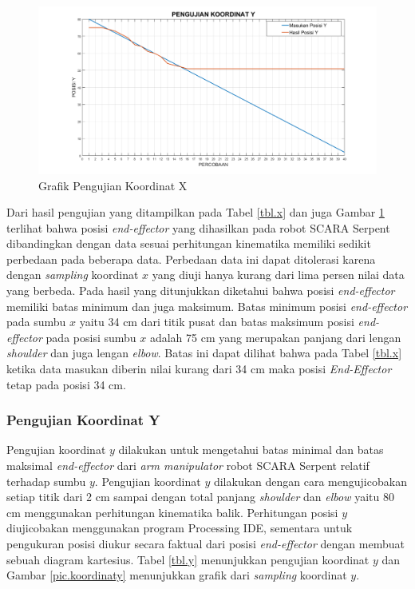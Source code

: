 \fontsize{12}{15}\selectfont
\begin{figure}[H]
	\centering
	\includegraphics[width=12cm]{gambar/px.png}
	\caption{Grafik Pengujian Koordinat X}
	\label{pic.koordinatx}
\end{figure}

Dari hasil pengujian yang ditampilkan pada Tabel \ref{tbl.x} dan juga Gambar \ref{pic.koordinatx} terlihat bahwa posisi \textit{end-effector} yang dihasilkan pada robot SCARA Serpent dibandingkan dengan data sesuai perhitungan kinematika memiliki sedikit perbedaan pada beberapa data. Perbedaan data ini dapat ditolerasi karena dengan \textit{sampling} koordinat $x$ yang diuji hanya kurang dari lima persen nilai data yang berbeda. Pada hasil yang ditunjukkan diketahui bahwa posisi \textit{end-effector} memiliki batas minimum dan juga maksimum. Batas minimum posisi \textit{end-effector} pada sumbu $x$ yaitu 34 cm dari titik pusat dan batas maksimum posisi \textit{end-effector} pada posisi sumbu $x$ adalah 75 cm yang merupakan panjang dari lengan \textit{shoulder} dan juga lengan \textit{elbow}. Batas ini dapat dilihat bahwa pada Tabel \ref{tbl.x} ketika data masukan diberin nilai kurang dari 34 cm maka posisi \textit{End-Effector} tetap pada posisi 34 cm.


\subsubsection{Pengujian Koordinat Y}

Pengujian koordinat $y$ dilakukan untuk mengetahui batas minimal dan batas maksimal \textit{end-effector} dari \textit{arm manipulator} robot SCARA Serpent relatif terhadap sumbu $y$. Pengujian koordinat $y$ dilakukan dengan cara mengujicobakan setiap titik dari 2 cm sampai dengan total panjang \textit{shoulder} dan \textit{elbow} yaitu 80 cm menggunakan perhitungan kinematika balik. Perhitungan posisi $y$ diujicobakan menggunakan program Processing IDE, sementara untuk pengukuran posisi diukur secara faktual dari posisi \textit{end-effector} dengan membuat sebuah diagram kartesius. Tabel \ref{tbl.y} menunjukkan pengujian koordinat $y$ dan Gambar \ref{pic.koordinaty} menunjukkan grafik dari \textit{sampling} koordinat $y$.

